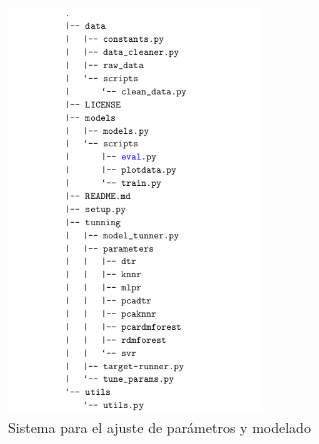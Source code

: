 \begin{appendix}
  \begin{figure}[hbt]
  \centering%
  \includegraphics[width=0.6\textwidth]{images/proyecto_modeling}%
  \caption{Sistema para el ajuste de parámetros y modelado}\label{fig:proyecto_modelado}
  \end{figure}

\end{appendix}
